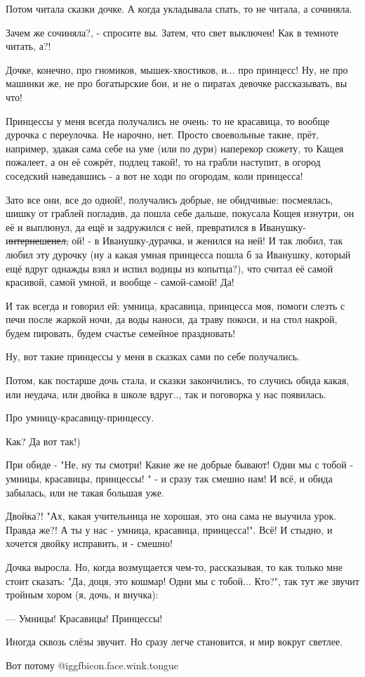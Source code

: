 Потом читала сказки дочке. А когда укладывала спать, то не читала, а сочиняла.

Зачем же сочиняла?, -  спросите вы. Затем, что свет выключен! Как в темноте
читать, а?! 

Дочке, конечно, про гномиков, мышек-хвостиков, и... про принцесс! Ну, не про
машинки же, не про богатырские бои, и не о пиратах девочке рассказывать, вы
что! 

Принцессы у меня всегда получались не очень: то не красавица, то вообще дурочка
с переулочка. Не нарочно, нет. Просто своевольные такие, прёт, например, эдакая
сама себе на уме (или по дури) наперекор сюжету, то Кащея пожалеет, а он её
сожрёт, подлец такой!, то на грабли наступит, в огород соседский наведавшись -
а вот не ходи по огородам, коли принцесса!

Зато все они, все до одной!, получались добрые, не обидчивые:  посмеялась,
шишку от граблей погладив, да пошла себе дальше, покусала Кощея изнутри, он её
и выплюнул, да ещё и задружился с ней, превратился в Иванушку-и̶н̶т̶е̶р̶н̶е̶ш̶е̶н̶е̶л̶, ой!
- в Иванушку-дурачка, и женился на ней! И так любил, так любил эту дурочку (ну
а какая умная принцесса пошла б за Иванушку, который ещё вдруг однажды взял и
испил водицы из копытца?), что считал её самой красивой, самой умной, и вообще
- самой-самой! Да!

И так всегда и говорил ей: умница, красавица, принцесса моя, помоги слезть с
печи после жаркой ночи, да воды наноси, да траву покоси, и на стол накрой,
будем пировать, будем счастье семейное праздновать!

Ну, вот такие принцессы у меня в сказках сами по себе получались.

Потом, как постарше дочь стала, и сказки закончились, то случись обида какая,
или неудача, или двойка в школе вдруг.., так и поговорка у нас появилась.

Про умницу-красавицу-принцессу.

Как? Да вот так!) 

При обиде - "Не, ну ты смотри! Какие же не добрые бывают! Одни мы с тобой -
умницы, красавицы, принцессы! " - и сразу так смешно нам! И всё, и обида
забылась, или не такая большая уже.

Двойка?! "Ах, какая учительница не хорошая, это она сама не выучила урок.
Правда же?! А ты у нас - умница, красавица, принцесса!". Всё! И стыдно, и
хочется двойку исправить, и - смешно!

Дочка выросла. Но, когда возмущается чем-то, рассказывая, то как только мне
стоит сказать: "Да, доця, это кошмар! Одни мы с тобой... Кто?", так тут же
звучит тройным хором (я, дочь, и внучка):

— Умницы! Красавицы! Принцессы!

Иногда сквозь слёзы звучит. Но сразу легче становится, и мир вокруг светлее. 

Вот потому  @igg{fbicon.face.wink.tongue} 
